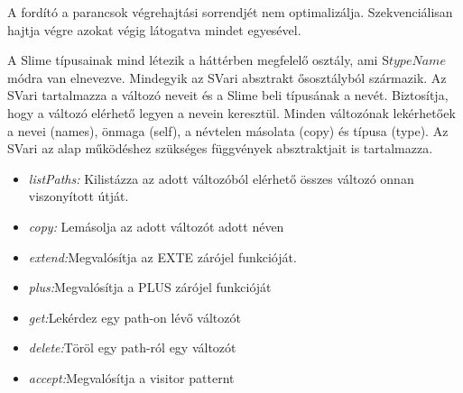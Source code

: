 {A fordító a parancsok végrehajtási sorrendjét nem optimalizálja.
Szekvenciálisan hajtja végre azokat végig látogatva mindet egyesével.

A Slime típusainak mind létezik a háttérben megfelelő osztály, ami S{$ typeName $} módra van elnevezve. 
Mindegyik az SVari absztrakt ősosztályból származik.
Az SVari tartalmazza a változó neveit és a Slime beli típusának a nevét.
Biztosítja, hogy a változó elérhető legyen a nevein keresztül.
Minden változónak lekérhetőek a nevei (names), önmaga (self), a névtelen másolata (copy) és típusa (type).
Az SVari az alap működéshez szükséges függvények absztraktjait is tartalmazza. 
\begin{itemize}
\item \emph{listPaths:} Kilistázza az adott változóból elérhető összes változó onnan viszonyított útját.
\item \emph{copy:} Lemásolja az adott változót adott néven
\item \emph{extend:}Megvalósítja az EXTE zárójel funkcióját.
\item \emph{plus:}Megvalósítja a PLUS zárójel funkcióját
\item \emph{get:}Lekérdez egy path-on lévő változót
\item \emph{delete:}Töröl egy path-ról egy változót
\item \emph{accept:}Megvalósítja a visitor patternt
\end{itemize}

}
